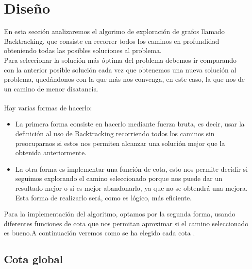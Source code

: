 \documentclass[11pt,openany]{book}
\begin{document}
\section{Diseño}   
En esta sección analizaremos el algorimo de exploración de grafos llamado Backtracking, que consiste en recorrer todos los caminos en profundidad obteniendo todas
las posibles soluciones al problema. \\
Para seleccionar la solución más óptima del problema debemos ir comparando con la anterior posible solución  cada vez que obtenemos una nueva solución al problema, quedándonos con la que más nos
convenga, en este caso, la que nos de un camino de menor disatancia.
\\ \\
Hay varias formas de hacerlo:
\begin{itemize}
      \item La primera forma consiste en hacerlo mediante fuerza bruta, es decir, usar la definición al uso de Backtracking recorriendo todos los caminos sin preocuparnos
      si estos nos permiten alcanzar una solución mejor que la obtenida anteriormente.
      \item La otra forma es implementar una función de cota, esto nos permite decidir si seguimos explorando el camino seleccionado porque nos puede dar un resultado mejor
      o si es mejor abandonarlo, ya que no se obtendrá una mejora.
      Esta forma de realizarlo será, como es lógico, más eficiente.
\end{itemize}

Para la implementación del algoritmo, optamos por la segunda forma, usando diferentes funciones de cota que nos permitan aproximar si el camino seleccionado es bueno.A continuación
veremos como se ha elegido cada cota .
\subsection{Cota global}
\end{document}
